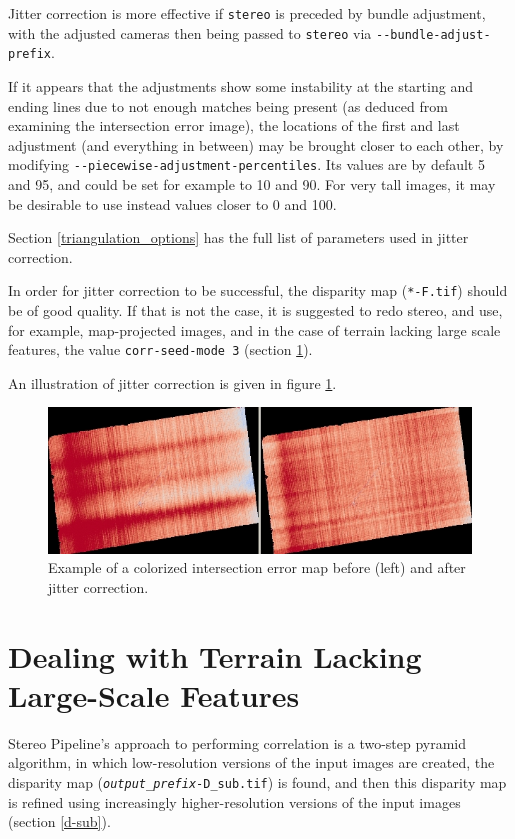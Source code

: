 Jitter correction is more effective if \texttt{stereo} is preceded by
bundle adjustment, with the adjusted cameras then being passed to \texttt{stereo}
via \texttt{-\/-bundle-adjust-prefix}.

If it appears that the adjustments show some instability at the starting
and ending lines due to not enough matches being present (as deduced
from examining the intersection error image), the locations of the first
and last adjustment (and everything in between) may be brought closer to
each other, by modifying \texttt{-\/-piecewise-adjustment-percentiles}.
Its values are by default 5 and 95, and could be set for example to 10
and 90. For very tall images, it may be desirable to use instead values
closer to 0 and 100.

Section \ref{triangulation_options} has the full list of parameters
used in jitter correction.

In order for jitter correction to be successful, the disparity map
(\texttt{*-F.tif}) should be of good quality. If that is not the case,
it is suggested to redo stereo, and use, for example, map-projected
images, and in the case of terrain lacking large scale features, the
value \texttt{corr-seed-mode 3} (section \ref{sparse-disp}).

An illustration of jitter correction is given in figure \ref{fig:jitter-example}.

\begin{figure}[h!]
\centering
  \includegraphics[width=6.0in]{images/jitter.jpg}
\caption{Example of a colorized intersection error map before (left) and
  after jitter correction.}
\label{fig:jitter-example}
\end{figure}


\section{Dealing with Terrain Lacking Large-Scale Features}
\label{sparse-disp}

Stereo Pipeline's approach to performing correlation is a two-step
pyramid algorithm, in which low-resolution versions of the input images
are created, the disparity map
(\texttt{\textit{output\_prefix}-D\_sub.tif}) is found, and then this
disparity map is refined using increasingly higher-resolution versions
of the input images (section \ref{d-sub}).

